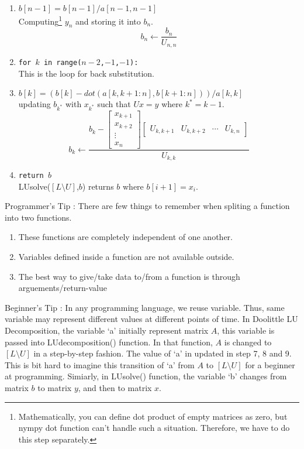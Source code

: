 \begin{commentary}
\begin{enumerate}[label=Line \arabic*]
	\item \texttt{$b[n-1] = b[n-1]/a[n-1,n-1]$} \\ Computing\footnote{Mathematically, you can define dot product of empty matrices as zero, but nympy dot function can't handle such a situation. Therefore, we have to do this step separately.} $y_n$ and storing it into $b_n$.
	\[b_n \leftarrow \frac{b_n}{U_{n,n}}\]
	\item \texttt{for $k$ in range($n-2$,$-1$,$-1$):}  \\ This is the loop for back substitution.
	\item \texttt{$b[k] = (b[k] - dot(a[k,k+1:n],b[k+1:n]))/a[k,k]$} \\ updating $b_{k^*}$ with $x_{k^*}$ such that $Ux = y$ where $k^* = k-1$.
	\[ b_k \leftarrow \frac{b_k - \begin{bmatrix} x_{k+1} \\ x_{k+2} \\ \vdots \\ x_n \end{bmatrix} \begin{bmatrix} U_{k,k+1} & U_{k,k+2} & \cdots & U_{k,n} \end{bmatrix}}{U_{k,k}} \]
	\item \texttt{return $b$} \\ LUsolve($[L\text{\textbackslash{}}U]$,$b$) returns $b$ where $b[i+1]=x_i$.
\end{enumerate}

	Programmer's Tip : There are few things to remember when spliting a function into two functions.
\begin{enumerate}
	\item These functions are completely independent of one another.
	\item Variables defined inside a function are not available outside.
	\item The best way to give/take data to/from a function is through arguements/return-value
\end{enumerate}

	Beginner's Tip : In any programming language, we reuse variable. Thus, same variable may represent different values at different points of time. In Doolittle LU Decomposition, the variable `a' initially represent matrix $A$, this variable is passed into LUdecomposition() function. In that function, $A$ is changed to $[L\text{\textbackslash{}}U]$ in a step-by-step fashion. The value of `a' in updated in step 7, 8 and 9. This is bit hard to imagine this transition of `a' from $A$ to $[L\text{\textbackslash{}}U]$ for a beginner at programming. Simiarly, in LUsolve() function, the variable `b' changes from matrix $b$ to matrix $y$, and then to matrix $x$.
\end{commentary}

